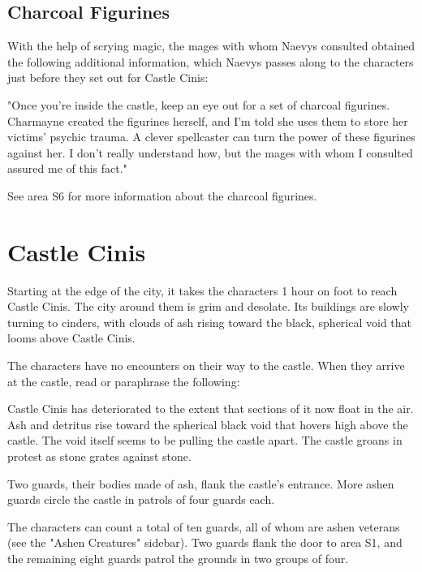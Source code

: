 \documentclass[10pt,a4paper,twoside,bg=print,twocolumn,openany,nodeprecatedcode]{dndbook}
\begin{document}
\subsection{Charcoal Figurines}
With the help of scrying magic, the mages with whom Naevys consulted obtained the following additional information, which Naevys passes along to the characters just before they set out for Castle Cinis:

\begin{DndReadAloud}{}
"Once you're inside the castle, keep an eye out for a set of charcoal figurines. Charmayne created the figurines herself, and I'm told she uses them to store her victims' psychic trauma. A clever spellcaster can turn the power of these figurines against her. I don't really understand how, but the mages with whom I consulted assured me of this fact."

\end{DndReadAloud}

See area S6 for more information about the charcoal figurines.

\section{Castle Cinis}
Starting at the edge of the city, it takes the characters 1 hour on foot to reach Castle Cinis. The city around them is grim and desolate. Its buildings are slowly turning to cinders, with clouds of ash rising toward the black, spherical void that looms above Castle Cinis.

The characters have no encounters on their way to the castle. When they arrive at the castle, read or paraphrase the following:

\begin{DndReadAloud}{}
Castle Cinis has deteriorated to the extent that sections of it now float in the air. Ash and detritus rise toward the spherical black void that hovers high above the castle. The void itself seems to be pulling the castle apart. The castle groans in protest as stone grates against stone.

Two guards, their bodies made of ash, flank the castle's entrance. More ashen guards circle the castle in patrols of four guards each.

\end{DndReadAloud}

The characters can count a total of ten guards, all of whom are ashen veterans (see the "Ashen Creatures" sidebar). Two guards flank the door to area S1, and the remaining eight guards patrol the grounds in two groups of four.
\end{document}
